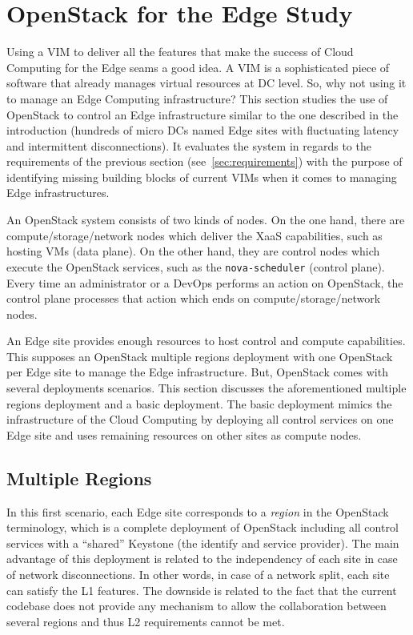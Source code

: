 \section{OpenStack for the Edge Study}
\label{sec:system_design_considerations}
Using a VIM to deliver all the features that make the success of Cloud
Computing for the Edge seams a good idea. A VIM is a sophisticated
piece of software that already manages virtual resources at DC level.
So, why not using it to manage an Edge Computing infrastructure? This
section studies the use of OpenStack to control an Edge infrastructure
similar to the one described in the introduction (hundreds of micro
DCs named Edge sites with fluctuating latency and intermittent
disconnections). It evaluates the system in regards to the
requirements of the previous section (see~\ref{sec:requirements}) with
the purpose of identifying missing building blocks of current VIMs
when it comes to managing Edge infrastructures.

An OpenStack system consists of two kinds of nodes. On the one hand,
there are compute/storage/network nodes which deliver the XaaS
capabilities, such as hosting VMs (\ie data plane). On the other hand,
they are control nodes which execute the OpenStack services, such as
the \verb|nova-scheduler| (\ie control plane). Every time an
administrator or a DevOps performs an action on OpenStack, the control
plane processes that action which ends on compute/storage/network
nodes.

An Edge site provides enough resources to host control and compute
capabilities. This supposes an OpenStack multiple regions deployment
with one OpenStack per Edge site to manage the Edge infrastructure.
But, OpenStack comes with several deployments scenarios. This section
discusses the aforementioned multiple regions deployment and a basic
deployment. The basic deployment mimics the infrastructure of the
Cloud Computing by deploying all control services on one Edge site and
uses remaining resources on other sites as compute nodes.

\subsection{Multiple Regions}
In this first scenario, each Edge site corresponds to a \emph{region}
in the OpenStack terminology, which is a complete deployment of
OpenStack including all control services with a ``shared'' Keystone
(\ie the identify and service provider). The main advantage of this
deployment is related to the independency of each site in case of
network disconnections. In other words, in case of a network split,
each site can satisfy the L1 features. The downside is related to the
fact that the current codebase does not provide any mechanism to allow
the collaboration between several regions and thus L2 requirements
cannot be met.

